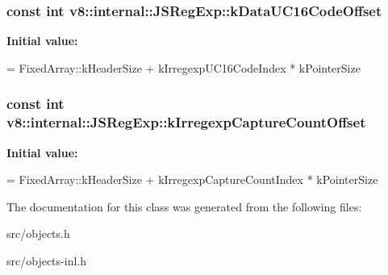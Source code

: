 \subsubsection[{k\+Data\+U\+C16\+Code\+Offset}]{\setlength{\rightskip}{0pt plus 5cm}const int v8\+::internal\+::\+J\+S\+Reg\+Exp\+::k\+Data\+U\+C16\+Code\+Offset\hspace{0.3cm}{\ttfamily [static]}}\label{classv8_1_1internal_1_1_j_s_reg_exp_a949f4bc648cd6a11a8e0e01b5a4e9641}
{\bfseries Initial value\+:}
\begin{DoxyCode}
=
      FixedArray::kHeaderSize + kIrregexpUC16CodeIndex * kPointerSize
\end{DoxyCode}
\hypertarget{classv8_1_1internal_1_1_j_s_reg_exp_a73f20a1f8eedfd27dad9c34fc2e24468}{}
\subsubsection[{k\+Irregexp\+Capture\+Count\+Offset}]{\setlength{\rightskip}{0pt plus 5cm}const int v8\+::internal\+::\+J\+S\+Reg\+Exp\+::k\+Irregexp\+Capture\+Count\+Offset\hspace{0.3cm}{\ttfamily [static]}}\label{classv8_1_1internal_1_1_j_s_reg_exp_a73f20a1f8eedfd27dad9c34fc2e24468}
{\bfseries Initial value\+:}
\begin{DoxyCode}
=
      FixedArray::kHeaderSize + kIrregexpCaptureCountIndex * kPointerSize
\end{DoxyCode}


The documentation for this class was generated from the following files\+:\begin{DoxyCompactItemize}
\item 
src/objects.\+h\item 
src/objects-\/inl.\+h\end{DoxyCompactItemize}
